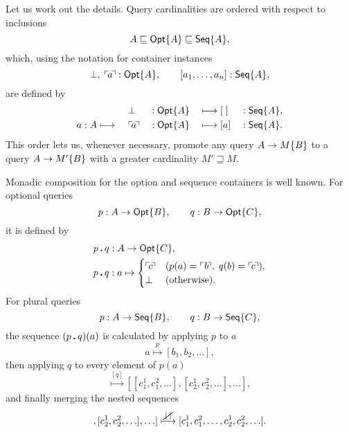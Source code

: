 Let us work out the details.  Query cardinalities are ordered with respect to
inclusions
\begin{equation*}
    A \sqsubseteq \mathsf{Opt}{\left\{A\right\}} \sqsubseteq \mathsf{Seq}{\left\{A\right\}},
\end{equation*}
which, using the notation for container instances
\begin{equation*}
    \bot,\; \ulcorner\!a\!\urcorner : \mathsf{Opt}{\left\{A\right\}}, \qquad [a_1,\ldots,a_n] : \mathsf{Seq}{\left\{A\right\}},
\end{equation*}
are defined by
\begin{alignat*}{5}
    & \; && \bot && : \mathsf{Opt}{\left\{A\right\}} && \longmapsto [\;] && : \mathsf{Seq}{\left\{A\right\}}, \\
    & a : A \longmapsto\ && \ulcorner\!a\!\urcorner && : \mathsf{Opt}{\left\{A\right\}} && \longmapsto [a] && : \mathsf{Seq}{\left\{A\right\}}.
\end{alignat*}
This order lets us, whenever necessary, promote any query $A\to M{\left\{B\right\}}$ to
a query $A\to M'{\left\{B\right\}}$ with a greater cardinality $M' \sqsupseteq M$.

Monadic composition for the option and sequence containers is well known.  For
optional queries
\begin{equation*}
    p : A \to \mathsf{Opt}{\left\{B\right\}}, \qquad q : B \to \mathsf{Opt}{\left\{C\right\}},
\end{equation*}
it is defined by
\begin{align*}
    & p\,\boldsymbol{.}\,q : A \to \mathsf{Opt}{\left\{C\right\}}, \\
    & p\,\boldsymbol{.}\,q : a \mapsto \begin{cases}
        \ulcorner\!c\!\urcorner & (p(a)=\ulcorner\!\,b\!\urcorner,\; q(b)=\ulcorner\!c\!\urcorner), \\
        \bot & (\text{otherwise}).
    \end{cases}
\end{align*}
For plural queries
\begin{equation*}
    p : A \to \mathsf{Seq}{\left\{B\right\}}, \qquad q : B \to \mathsf{Seq}{\left\{C\right\}},
\end{equation*}
the sequence $(p\,\boldsymbol{.}\,q)(a)$ is calculated by applying $p$ to $a$
\begin{equation*}
    a \overset{p}{\longmapsto} [b_1, b_2, \ldots],
\end{equation*}
then applying $q$ to every element of $p(a)$
\begin{equation*}
    [b_1, b_2, \ldots]
    \overset{[q]}{\longmapsto}
    [[c^{1}_{1}, c^{2}_{1}, \ldots], [c^{1}_{2}, c^{2}_{2}, \ldots], \ldots],
\end{equation*}
and finally merging the nested sequences
\begin{equation*}
    [[c^{1}_{1}, c^{2}_{1}, \ldots], [c^{1}_{2}, c^{2}_{2}, \ldots], \ldots]
    \overset{\cancel{\,[\;]\,}}{\longmapsto}
    [c^{1}_{1}, c^{2}_{1}, \ldots, c^{1}_{2}, c^{2}_{2}, \ldots].
\end{equation*}


